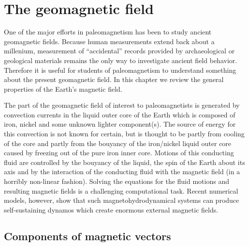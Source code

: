 \chapter{The geomagnetic field}



One of the major efforts in paleomagnetism has been to study
ancient geomagnetic fields. Because human measurements extend back about a millenium, measurement of ``accidental'' records provided by  archaeological or geological materials remains the only way to investigate ancient field behavior.  Therefore it is useful for students of paleomagnetism to understand something about the present geomagnetic field.  In this chapter we review the
general properties of the Earth's magnetic field.  

The part of the geomagnetic 
field of interest to paleomagnetists is generated by convection currents in the liquid outer core
of the Earth which is composed of iron, nickel and some unknown lighter
component(s). The source of energy for this convection is not known for certain, but is thought to be partly from cooling of the core and partly from the bouyancy of the iron/nickel liquid outer core caused by freezing out of the pure iron inner core.    Motions of this conducting fluid  are 
controlled by the bouyancy of the liquid, the 
spin of the Earth about its axis and by the interaction of the conducting fluid with the magnetic field (in a horribly non-linear fashion).  Solving the equations for the  fluid motions and resulting magnetic fields is a challenging computational task.   Recent numerical models, however, show that  such magnetohydrodynamical systems can   produce self-sustaining dynamos which  create
enormous external magnetic fields.  



\section {Components of magnetic vectors}
\label{sect:comp}

